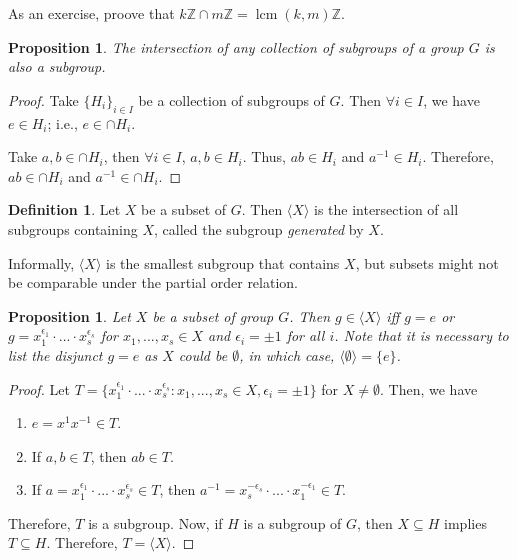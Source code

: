 \documentclass{amsart}
\newtheorem{prop}[thm]{Proposition}
\theoremstyle{definition}
\newtheorem{definition}[thm]{Definition}
\newcommand{\Z}{\mathbb Z}
\DeclareMathOperator{\lcm}{lcm}
\begin{document}
As an exercise, proove that $k\Z\cap m\Z=\lcm(k,m)\Z$.
\begin{prop}
	The intersection of any collection of subgroups of a group $G$ is also a subgroup.
\end{prop}
\begin{proof}
	Take $\{H_i\}_{i\in I}$ be a collection of subgroups of $G$. Then $\forall i\in I$, we have $e\in H_i$; i.e., $e\in \cap H_i$.
	
	Take $a,b\in\cap H_i$, then $\forall i\in I$, $a,b\in H_i$. Thus, $ab\in H_i$ and $a^{-1}\in H_i$. Therefore, $ab\in\cap H_i$ and $a^{-1}\in \cap H_i$.
\end{proof}
\begin{definition}
	Let $X$ be a subset of $G$. Then $\langle X\rangle$ is the intersection of all subgroups containing $X$, called the subgroup \emph{generated} by $X$.
\end{definition}
Informally, $\langle X\rangle$ is the smallest subgroup that contains $X$, but subsets might not be comparable under the partial order relation.
\begin{prop}
	Let $X$ be a subset of group $G$. Then $g\in\langle X\rangle$ iff $g=e$ or $g=x_1^{\epsilon_1}\cdot ...\cdot x_s^{\epsilon_s}$ for $x_1,...,x_s\in X$ and $\epsilon_i=\pm 1$ for all $i$. Note that it is necessary to list the disjunct $g=e$ as $X$ could be $\emptyset$, in which case, $\langle \emptyset\rangle=\{e\}$.
\end{prop}
\begin{proof}
	Let $T=\{x_1^{\epsilon_1}\cdot ...\cdot x_s^{\epsilon_s}: x_1,...,x_s\in X, \epsilon_i=\pm 1\}$ for $X\not=\emptyset$. Then, we have
	\begin{enumerate}
		\item $e=x^1x^{-1}\in T$.
		\item If $a,b\in T$, then $ab\in T$.
		\item If $a=x_1^{\epsilon_1}\cdot ...\cdot x_s^{\epsilon_s}\in T$, then $a^{-1}=x_s^{-\epsilon_s}\cdot ...\cdot x_1^{-\epsilon_1}\in T$.
	\end{enumerate}
	
	Therefore, $T$ is a subgroup. Now, if $H$ is a subgroup of $G$, then $X\subseteq H$ implies $T\subseteq H$. Therefore, $T=\langle X\rangle$.
\end{proof}
\end{document}
